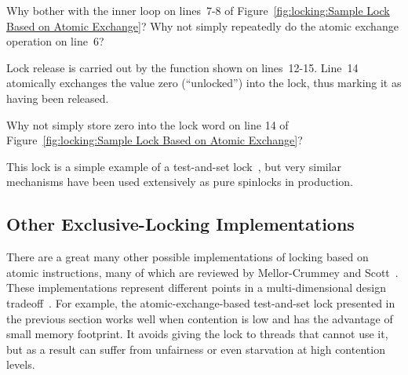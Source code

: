 \QuickQuiz{}
	Why bother with the inner loop on lines~7-8 of
	Figure~\ref{fig:locking:Sample Lock Based on Atomic Exchange}?
	Why not simply repeatedly do the atomic exchange operation
	on line~6?
 \QuickQuizEnd

Lock release is carried out by the  function
shown on lines~12-15.
Line~14 atomically exchanges the value zero (``unlocked'') into
the lock, thus marking it as having been released.

\QuickQuiz{}
	Why not simply store zero into the lock word on line 14 of
	Figure~\ref{fig:locking:Sample Lock Based on Atomic Exchange}?
 \QuickQuizEnd

This lock is a simple example of a test-and-set lock~\cite{Segall84},
but very similar
mechanisms have been used extensively as pure spinlocks in production.

\subsection{Other Exclusive-Locking Implementations}
\label{sec:locking:Other Exclusive-Locking Implementations}

There are a great many other possible implementations of locking
based on atomic instructions, many of which are reviewed
by Mellor-Crummey and Scott~\cite{MellorCrummey91a}.
These implementations represent different points in a multi-dimensional
design tradeoff~\cite{McKenney96a}.
For example,
the atomic-exchange-based test-and-set lock presented in the previous
section works well when contention is low and has the advantage
of small memory footprint.
It avoids giving the lock to threads that cannot use it, but as
a result can suffer from unfairness or even starvation at high
contention levels.

